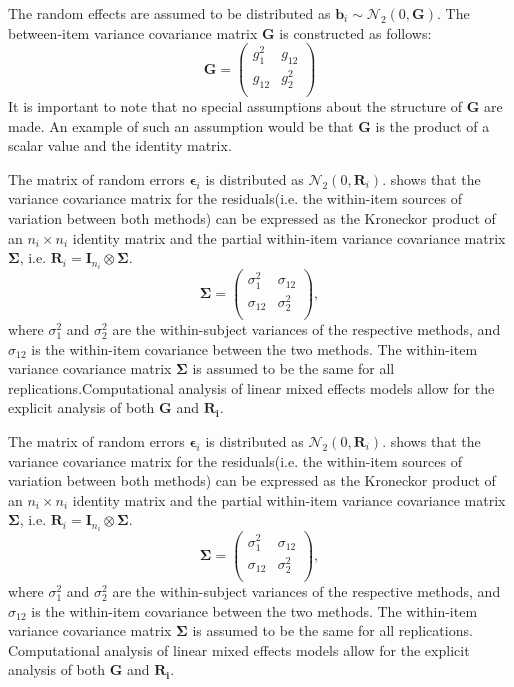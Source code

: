 \documentclass[12pt, a4paper]{report}
\theoremstyle{plain}
\theoremstyle{definition}
\theoremstyle{remark}
\begin{document}
The random effects are assumed to be distributed as $\boldsymbol{b}_i \sim \mathcal{N}_2(0,\boldsymbol{G})$. The between-item variance covariance matrix $\boldsymbol{G}$ is constructed as follows:
\[ \boldsymbol{G} =\left(
\begin{array}{cc}
g^2_1  & g_{12} \\
g_{12} & g^2_2 \\
\end{array}
\right) \]
It is important to note that no special assumptions about the structure of $\boldsymbol{G}$ are made. An example of such an assumption would be that $\boldsymbol{G}$ is the product of a scalar value and the identity matrix.


The matrix of random errors $\boldsymbol{\epsilon}_i$ is distributed as $\mathcal{N}_2(0,\boldsymbol{R}_i)$.
\citet{hamlett} shows that the variance covariance matrix for the residuals(i.e. the within-item sources of variation between both methods) can be expressed as the Kroneckor product of an $n_i \times n_i$ identity matrix and the partial within-item variance covariance matrix $\boldsymbol{\Sigma}$, i.e. $\boldsymbol{R}_{i} = \boldsymbol{I}_{n_{i}} \otimes \boldsymbol{\Sigma}$.
\[
\boldsymbol{\Sigma} = \left( \begin{array}{cc}
\sigma^2_{1} & \sigma_{12} \\
\sigma_{12} & \sigma^2_{2} \\
\end{array}\right),
\]
where $\sigma^2_{1}$ and $\sigma^2_{2}$ are the within-subject variances of the respective methods, and $\sigma_{12}$ is the within-item covariance between the two methods. The within-item variance covariance matrix $\boldsymbol{\Sigma}$ is assumed to be the same for all replications.Computational analysis of linear mixed effects models allow for the explicit analysis of both $\boldsymbol{G}$ and $\boldsymbol{R_i}$.



The matrix of random errors $\boldsymbol{\epsilon}_i$ is distributed as $\mathcal{N}_2(0,\boldsymbol{R}_i)$.
\citet{hamlett} shows that the variance covariance matrix for the residuals(i.e. the within-item sources of variation between both methods) can be expressed as the Kroneckor product of an $n_i \times n_i$ identity matrix and the partial within-item variance covariance matrix $\boldsymbol{\Sigma}$, i.e. $\boldsymbol{R}_{i} = \boldsymbol{I}_{n_{i}} \otimes \boldsymbol{\Sigma}$.
\[
\boldsymbol{\Sigma} = \left( \begin{array}{cc}
\sigma^2_{1} & \sigma_{12} \\
\sigma_{12} & \sigma^2_{2} \\
\end{array}\right),
\]
where $\sigma^2_{1}$ and $\sigma^2_{2}$ are the within-subject variances of the respective methods, and $\sigma_{12}$ is the within-item covariance between the two methods. The within-item variance covariance matrix $\boldsymbol{\Sigma}$ is assumed to be the same for all replications. Computational analysis of linear mixed effects models allow for the explicit analysis of both $\boldsymbol{G}$ and $\boldsymbol{R_i}$. 
\end{document}
